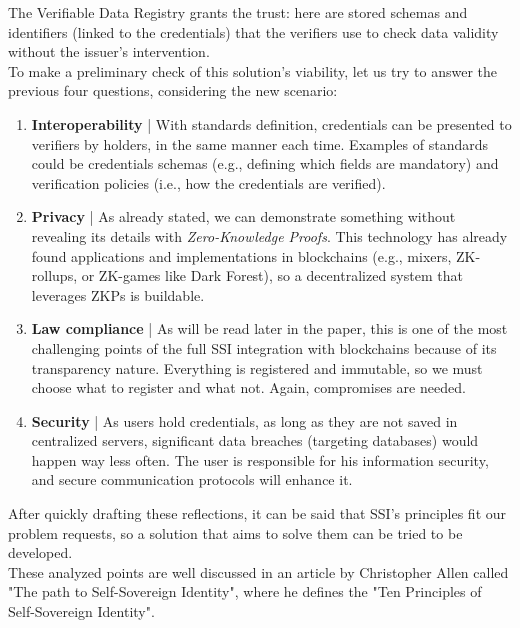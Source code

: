 The Verifiable Data Registry grants the trust: here are stored schemas and 
identifiers (linked to the credentials) that the verifiers use to check 
data validity without the issuer's intervention.
\vspace*{0.3cm}\\
To make a preliminary check of this solution's viability, let us try to 
answer the previous four questions, considering the new scenario:
\begin{enumerate}
    \item \textbf{Interoperability} | With standards definition, credentials
    can be presented to verifiers by holders, in the same manner each time. 
    Examples of standards could be credentials schemas (e.g., defining which fields are 
    mandatory) and verification policies (i.e., how the credentials are verified).
    \item \textbf{Privacy} | As already stated, we can demonstrate something
    without revealing its details with \textit{Zero-Knowledge Proofs}. This 
    technology has already found applications and implementations in 
    blockchains (e.g., mixers, ZK-rollups, or ZK-games like Dark Forest), 
    so a decentralized system that leverages ZKPs is buildable.
    \item \textbf{Law compliance} | As will be read later in the paper, 
    this is one of the most challenging points of the full SSI integration 
    with blockchains because of its transparency nature. Everything is 
    registered and immutable, so we must choose what to register and what 
    not. Again, compromises are needed.
    \item \textbf{Security} | As users hold credentials, as long as they are
    not saved in centralized servers, significant data breaches (targeting 
    databases) would happen way less often. The user is responsible for his 
    information security, and secure communication protocols will enhance it.
\end{enumerate}
After quickly drafting these reflections, it can be said that SSI's 
principles fit our problem requests, so a solution that aims to solve them 
can be tried to be developed.\\
These analyzed points are well discussed in an article by Christopher Allen 
called "The path to Self-Sovereign Identity", where he defines the "Ten 
Principles of Self-Sovereign Identity".

